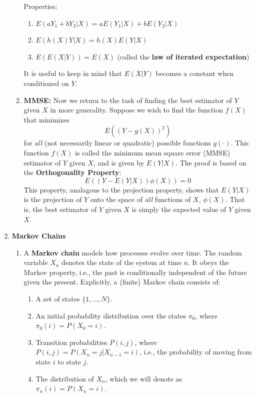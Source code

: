 \documentclass[10pt]{article}
\begin{document}
\begin{multicols}{2}
\begin{enumerate}
\begin{enumerate}
            Properties:
            \begin{enumerate}
                \item $E(aY_1+bY_2|X)=aE(Y_1|X)+bE(Y_2|X)$
                \item $E(h(X)Y|X)=h(X)E(Y|X)$
                \item $E(E(X|Y))=E(X)$ (called the \textbf{law of iterated expectation})
            \end{enumerate}
            It is useful to keep in mind that $E(X|Y)$ becomes a constant when conditioned on $Y$.
            \item \textbf{MMSE:} Now we return to the task of finding the best estimator of $Y$ given $X$ in more generality. Suppose we wish to find the function $f(X)$ that minimizes $$E((Y-g(X))^2)$$ for \textit{all} (not necessarily linear or quadratic) possible functions $g(\cdot)$. This function $f(X)$ is called the minimum mean square error (MMSE) estimator of $Y$ given $X$, and is given by $E(Y|X)$. The proof is based on the
            \textbf{Orthogonality Property}: $$E((Y-E(Y|X))\phi(X))=0$$
            This property, analagous to the projection property, shows that $E(Y|X)$ is the projection of $Y$ onto the space of \textit{all} functions of $X$, $\phi(X)$. That is, the best estimator of $Y$ given $X$ is simply the expected value of $Y$ given $X$.
        \end{enumerate}
        \item \textbf{Markov Chains}
        \begin{enumerate}
            \item A \textbf{Markov chain} models how processes evolve over time. The random variable $X_n$ denotes the state of the system at time $n$. It obeys the Markov property, i.e., the past is conditionally independent of the future given the present. Explicitly, a (finite) Markov chain consists of:
            \begin{enumerate}
                \item A set of states $\{1,\ldots,N\}$.
                \item An initial probability distribution over the states $\pi_0$, where $\pi_0(i) = P(X_0 = i)$.
                \item Transition probabilities $P(i,j)$, where $P(i,j) = P(X_n=j| X_{n-1}=i)$, i.e., the probability of moving from state $i$ to state $j$.
                \item The distribution of $X_n$, which we will denote as $\pi_n(i) = P(X_n = i)$.
            \end{enumerate}

\end{enumerate}
\end{enumerate}
\end{multicols}
\end{document}
